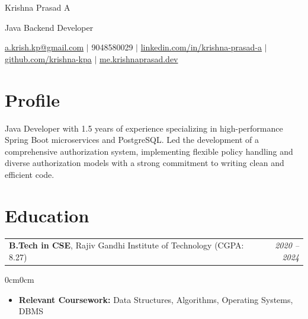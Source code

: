 \documentclass[10pt, letterpaper]{article}
\makeatletter
\newenvironment{highlights}{
\begin{itemize}[topsep=0.08cm,parsep=0.08cm,partopsep=0pt,itemsep=0pt,leftmargin=10pt]}{\end{itemize}}
\newenvironment{onecolentry}{\begin{adjustwidth}{0cm}{0cm}}{\end{adjustwidth}}
\newcommand{\twocolentry}[2]{%
  \noindent\begin{tabular*}{\textwidth}{@{}p{0.70\textwidth}@{\extracolsep{\fill}}r@{}}
  #2 & \textit{#1} \\
  \end{tabular*}\par
}
\newenvironment{header}{\centering\linespread{1.5}}{}
\makeatother
\begin{document}
\begin{header}
    \fontsize{25 pt}{25 pt}\selectfont Krishna Prasad A

    \vspace{ pt}
    \fontsize{15 pt}{15 pt}\selectfont Java Backend Developer

    \vspace{5 pt}
    \normalsize
    \href{mailto:a.krish.kp@gmail.com}{a.krish.kp@gmail.com} $|$ 9048580029 $|$
    \href{https://www.linkedin.com/in/krishna-prasad-a-579261214/}{linkedin.com/in/krishna-prasad-a} $|$
    \href{https://github.com/krishna-kpa}{github.com/krishna-kpa} $|$
    \href{https://me.krishnaprasad.dev/}{me.krishnaprasad.dev}
\end{header}

\vspace{3pt}
\section{Profile}
Java Developer with 1.5 years of experience specializing in high-performance Spring Boot microservices and PostgreSQL. Led the development of a comprehensive authorization system, implementing flexible policy handling and diverse authorization models with a strong commitment to writing clean and efficient code.

\section{Education}
\twocolentry{2020 – 2024}{\textbf{B.Tech in CSE}, Rajiv Gandhi Institute of Technology (CGPA: 8.27)}
\vspace{0.05cm}
\begin{onecolentry}
\begin{highlights}
    \item \textbf{Relevant Coursework:} Data Structures, Algorithms, Operating Systems, DBMS
\end{highlights}
\end{onecolentry}
\end{document}
